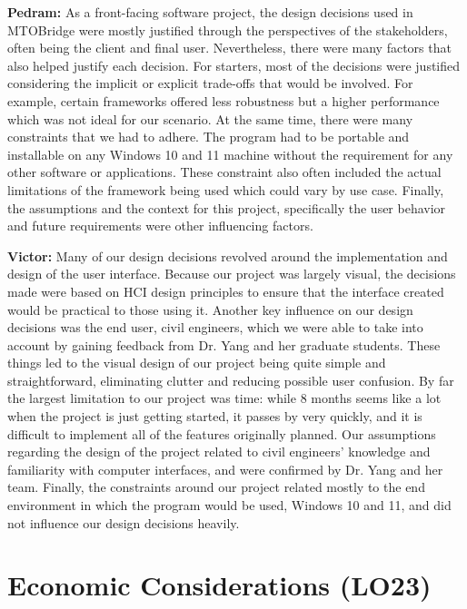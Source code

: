 \documentclass{article}
\begin{document}
\textbf{Pedram:} As a front-facing software project, the design decisions used in MTOBridge were mostly justified through the perspectives of the stakeholders, often being the client and final user. Nevertheless, there were many factors that also helped justify each decision. For starters, most of the decisions were justified considering the implicit or explicit trade-offs that would be involved. For example, certain frameworks offered less robustness but a higher performance which was not ideal for our scenario. At the same time, there were many constraints that we had to adhere. The program had to be portable and installable on any Windows 10 and 11 machine without the requirement for any other software or applications. These constraint also often included the actual limitations of the framework being used which could vary by use case. Finally, the assumptions and the context for this project, specifically the user behavior and future requirements were other influencing factors. 

\textbf{Victor:} Many of our design decisions revolved around the implementation and design of the user interface. Because our project was largely visual, the decisions made were based on HCI design principles to ensure that the interface created would be practical to those using it. Another key influence on our design decisions was the end user, civil engineers, which we were able to take into account by gaining feedback from Dr. Yang and her graduate students. These things led to the visual design of our project being quite simple and straightforward, eliminating clutter and reducing possible user confusion. By far the largest limitation to our project was time: while 8 months seems like a lot when the project is just getting started, it passes by very quickly, and it is difficult to implement all of the features originally planned. Our assumptions regarding the design of the project related to civil engineers' knowledge and familiarity with computer interfaces, and were confirmed by Dr. Yang and her team. Finally, the constraints around our project related mostly to the end environment in which the program would be used, Windows 10 and 11, and did not influence our design decisions heavily. 

\section{Economic Considerations (LO23)}

\end{document}
